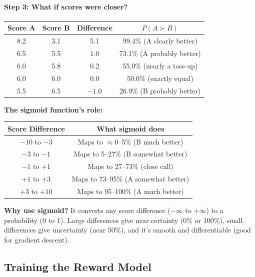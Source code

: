 \begin{chapterenv}
\paragraph{Step 3: What if scores were closer?}

\begin{center}
\begin{tabular}{cccc}
\toprule
\textbf{Score A} & \textbf{Score B} & \textbf{Difference} & \textbf{$P(A \succ B)$} \\
\midrule
8.2 & 3.1 & 5.1 & 99.4\% (A clearly better) \\
6.5 & 5.5 & 1.0 & 73.1\% (A probably better) \\
6.0 & 5.8 & 0.2 & 55.0\% (nearly a toss-up) \\
6.0 & 6.0 & 0.0 & 50.0\% (exactly equal) \\
5.5 & 6.5 & $-1.0$ & 26.9\% (B probably better) \\
\bottomrule
\end{tabular}
\end{center}

\textbf{The sigmoid function's role:}

\begin{center}
\begin{tabular}{cc}
\toprule
\textbf{Score Difference} & \textbf{What sigmoid does} \\
\midrule
$-10$ to $-3$ & Maps to $\approx$0--5\% (B much better) \\
$-3$ to $-1$ & Maps to 5--27\% (B somewhat better) \\
$-1$ to $+1$ & Maps to 27--73\% (close call) \\
$+1$ to $+3$ & Maps to 73--95\% (A somewhat better) \\
$+3$ to $+10$ & Maps to 95--100\% (A much better) \\
\bottomrule
\end{tabular}
\end{center}

\begin{infobox}
\textbf{Why use sigmoid?} It converts any score difference ($-\infty$ to $+\infty$) to a probability (0 to 1). Large differences give near certainty (0\% or 100\%), small differences give uncertainty (near 50\%), and it's smooth and differentiable (good for gradient descent).
\end{infobox}

\subsection{Training the Reward Model}


\end{chapterenv}
